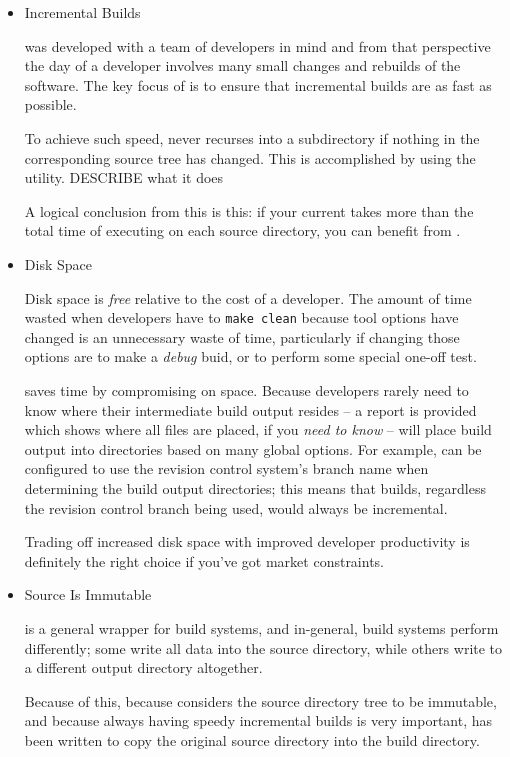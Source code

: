 \begin{itemize}
\item Incremental Builds

  \lmsbw was developed with a team of developers in mind and from that
  perspective the day of a developer involves many small changes and
  rebuilds of the software.  The key focus of \lmsbw is to ensure that
  incremental builds are as fast as possible.

  To achieve such speed, \lmsbw never recurses into a subdirectory if
  nothing in the corresponding source tree has changed.  This is
  accomplished by using the \mtree utility.  DESCRIBE what it does

  A logical conclusion from this is this: if your current \nullbuild
  takes more than the total time of executing \mtree on each source
  directory, you can benefit from \lmsbw.

\item Disk Space

  Disk space is \emph{free} relative to the cost of a developer.  The
  amount of time wasted when developers have to \texttt{make clean}
  because tool options have changed is an unnecessary waste of time,
  particularly if changing those options are to make a \emph{debug}
  buid, or to perform some special one-off test.

  \lmsbw saves time by compromising on space.  Because developers
  rarely need to know where their intermediate build output resides --
  a report is provided which shows where all files are placed, if you
  \emph{need to know} -- \lmsbw will place build output into
  directories based on many global options.  For example, \lmsbw can
  be configured to use the revision control system's branch name when
  determining the build output directories; this means that builds,
  regardless the revision control branch being used, would always be
  incremental.

  Trading off increased disk space with improved developer
  productivity is definitely the right choice if you've got market
  constraints.

\item Source Is Immutable

  \lmsbw is a general wrapper for build systems, and in-general, build
  systems perform differently; some write all data into the source
  directory, while others write to a different output directory
  altogether.

  Because of this, because \lmsbw considers the source directory tree
  to be immutable, and because always having speedy incremental builds
  is very important, \lmsbw has been written to copy the original
  source directory into the build directory.


\end{itemize}

